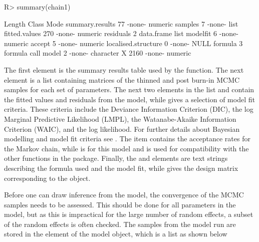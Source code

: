 \documentclass[article,shortnames,nojss]{jss}
\begin{document}
\begin{CodeInput}
R> summary(chain1)
\end{CodeInput}

\begin{CodeOutput}
                   Length Class      Mode     
summary.results       77   -none-     numeric  
samples                7   -none-     list     
fitted.values        270   -none-     numeric  
residuals              2   data.frame list     
modelfit               6   -none-     numeric  
accept                 5   -none-     numeric  
localised.structure    0   -none-     NULL     
formula                3   formula    call     
model                  2   -none-     character
X                   2160   -none-     numeric  
\end{CodeOutput}



The first element is the summary results table used by the  function. The next element is a list containing matrices of the thinned and post burn-in MCMC samples for each set of parameters.  The next two elements in the list   and  contain  the fitted values and residuals from the model, while  gives a selection of model fit criteria. These criteria include the Deviance Information Criterion (DIC), the log Marginal Predictive Likelihood (LMPL), the Watanabe-Akaike Information Criterion (WAIC), and the log likelihood. For further details about Bayesian modelling and model fit criteria see \cite{gelman2003}. The item  contains the acceptance rates for the Markov chain, while  is  for this model and is used for compatibility with the other functions in the package. Finally, the  and  elements are text strings describing the formula used and the model fit, while  gives the design matrix corresponding to the  object. 

\hspace{1cm} Before one can draw inference from the model, the convergence of the MCMC samples needs to be assessed. This should be done for all parameters in the model, but as this is impractical for the large number of random effects, a subset of the random effects is often checked. The samples from the model run are stored in the  element of the model object, which is a list as shown below

\end{document}
